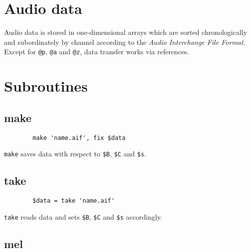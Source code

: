 \documentclass[a4paper, 10pt]{article}
\begin{document}
	\section*{Audio data}
	
	Audio data is stored in one-dimensional arrays which are sorted chronologically and subordinately by channel according to the {\it Audio Interchange File Format}. Except for \verb|@p|, \verb|@a| and \verb|@z|, data transfer works via references.
	
	\section*{Subroutines}
	
	\subsection*{make}
	
	\begin{verbatim}
		make 'name.aif', fix $data
	\end{verbatim}
	\verb|make| saves data with respect to \verb|$B|, \verb|$C| and \verb|$s|.
	
	\subsection*{take}
	
	\begin{verbatim}
		$data = take 'name.aif'
	\end{verbatim}
	\verb|take| reads data and sets \verb|$B|, \verb|$C| and \verb|$s| accordingly.
	
	\subsection*{mel}
	
\end{document}
